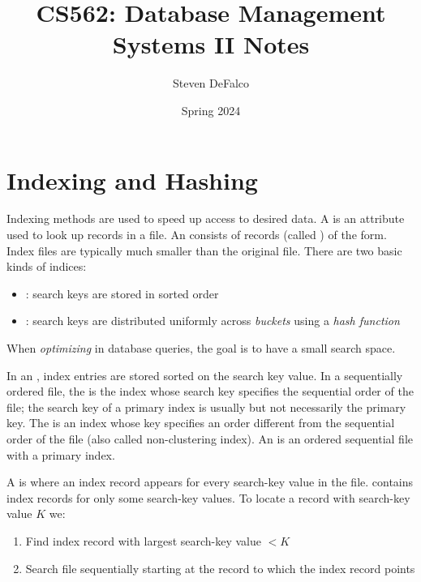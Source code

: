 \documentclass{article}
\title{CS562: Database Management Systems II Notes}
\author{Steven DeFalco}
\date{Spring 2024}
\begin{document}
\maketitle
\tableofcontents
\newpage


\section{Indexing and Hashing}

Indexing methods are used to speed up access to desired data. A  is an attribute used to look up records in a file. An  consists of records (called ) of the form. Index files are typically much smaller than the original file. There are two basic kinds of indices:
\begin{itemize}
  \item {}: search keys are stored in sorted order 
  \item {}: search keys are distributed uniformly across \emph{buckets} using a \emph{hash function}
\end{itemize}

\begin{remark}
  When \emph{optimizing} in database queries, the goal is to have a small search space. 
\end{remark}

In an , index entries are stored sorted on the search key value. In a sequentially ordered file, the  is the index whose search key specifies the sequential order of the file; the search key of a primary index is usually but not necessarily the primary key. The  is an index whose key specifies an order different from the sequential order of the file (also called non-clustering index). An  is an ordered sequential file with a primary index. 

A  is where an index record appears for every search-key value in the file.  contains index records for only some search-key values. To locate a record with search-key value $K$ we: 
\begin{enumerate}
  \item Find index record with largest search-key value $<K$ 
  \item Search file sequentially starting at the record to which the index record points
\end{enumerate}
\end{document}
